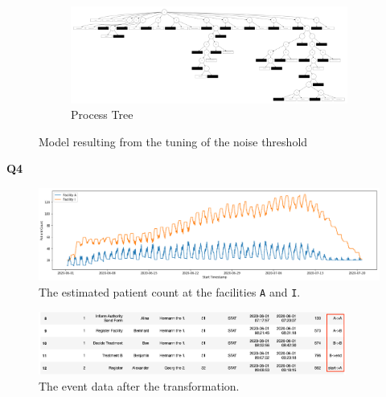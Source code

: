 \documentclass[12pt]{report}
\begin{document}
\begin{figure}[h]
    \begin{subfigure}[b]{0.7\textwidth}
        \centering
	\includegraphics[width=\textwidth]{figures/q1_d_noise_threshold_tuning.pdf}
        \caption{Process Tree}
        \label{fig:q1_d_noise_threshold_tuninig-pdf}
    \end{subfigure}
    \hfill
    \caption{Model resulting from the tuning of the noise threshold}
    \label{fig:noise-threshold-tuning-model}
\end{figure}

\textbf{Q4}

\begin{figure}[h]
    \centering
    \includegraphics[width=\textwidth]{figures/q4_fac_count.png}
    \caption{The estimated patient count at the facilities \texttt{A} and \texttt{I}.}
    \label{fig:figures-q4-fac-count-png}
\end{figure}

\begin{figure}[h]
    \centering
    \includegraphics[width=0.9\textwidth]{figures/q4_fac_move.png}
    \caption{The event data after the transformation.}
    \label{fig:figures-q4-fac-move-png}
\end{figure}
\end{document}
